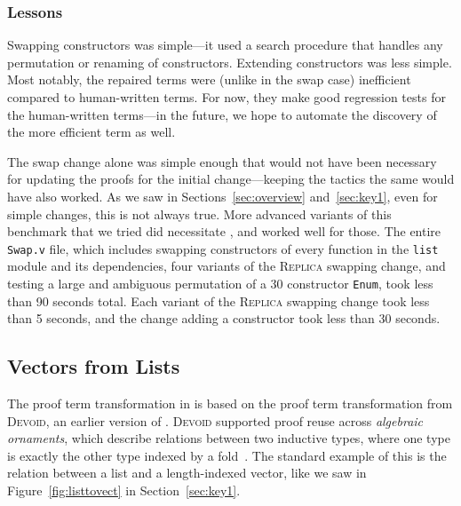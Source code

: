 \subsubsection{Lessons}

Swapping constructors was simple---it used a search procedure that handles
any permutation or renaming of constructors.
Extending constructors was less simple.
Most notably, the repaired terms were (unlike in the swap case) inefficient compared to human-written terms.
For now, they make good regression tests for the human-written terms---in the future,
we hope to automate the discovery of the more efficient term as well.

The swap change alone was simple enough that \toolname would not have been necessary
for updating the proofs for the initial change---keeping the tactics the same would have also worked.
As we saw in Sections~\ref{sec:overview} and~\ref{sec:key1}, even for simple changes, this is not always true.
More advanced variants of this benchmark that we tried did necessitate \toolname,
and \toolname worked well for those. %
The entire \lstinline{Swap.v} file, which includes swapping constructors of every function in the \lstinline{list} module and
its dependencies, four variants of the \textsc{Replica} swapping change,
and testing a large and ambiguous permutation of a 30 constructor \lstinline{Enum},
took \toolname less than 90 seconds total. %
Each variant of the \textsc{Replica} swapping change took \toolname less than 5 seconds, %
and the change adding a constructor took \toolname less than 30 seconds. %

\subsection{Vectors from Lists}
\label{sec:dep}

The proof term transformation in \toolname is based on the proof term transformation from
\textsc{Devoid}, an earlier version of \toolname.
\textsc{Devoid} supported proof reuse across \textit{algebraic ornaments}, which describe relations
between two inductive types, where one type is exactly the other type indexed by a fold~\cite{mcbride}.
The standard example of this is the relation between a list and a
length-indexed vector, like we saw in Figure~\ref{fig:listtovect} in Section~\ref{sec:key1}.

